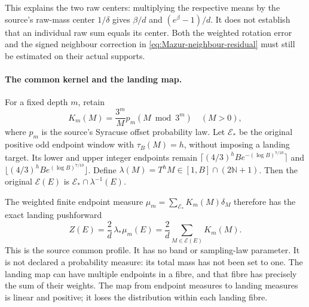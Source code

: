 This explains the two raw centers: multiplying the respective means
by the source's raw-mass center $1/\delta$ gives
$\beta/d$ and $(e^\beta-1)/d$. It does not establish that an
individual raw sum equals its center. Both the weighted rotation error
and the signed neighbour correction in
\eqref{eq:Mazur-neighbour-residual} must still be estimated on their
actual supports.

\paragraph{The common kernel and the landing map.}
For a fixed depth $m$, retain
\[
 K_m(M)=\frac{3^m}{M}p_m(M\bmod3^m)\quad(M>0),
\]
where $p_m$ is the source's Syracuse offset probability law.
Let $\mathcal E_*$ be the original positive odd endpoint window
with $\tau_B(M)=h$, without imposing a landing target. Its lower
and upper integer endpoints remain
$\lceil(4/3)^hB e^{-(\log B)^{7/10}}\rceil$ and
$\lfloor(4/3)^hB e^{(\log B)^{7/10}}\rfloor$.
Define $\lambda(M)=T^hM\in[1,B]\cap(2\mathbb N+1)$.
Then the original $\mathcal E(E)$ is
$\mathcal E_*\cap\lambda^{-1}(E)$.

The weighted finite endpoint measure $\mu_m=\sum_{\mathcal E_*}
K_m(M)\delta_M$ therefore has the exact landing pushforward
\[
 Z(E)=\frac2d\,\lambda_*\mu_m(E)
     =\frac2d\sum_{M\in\mathcal E(E)}K_m(M).
\]
This is the source common profile. It has no band or sampling-law
parameter. It is not declared a probability measure: its total mass
has not been set to one. The landing map can have multiple endpoints
in a fibre, and that fibre has precisely the sum of their weights.
The map from endpoint measures to landing measures is linear and
positive; it loses the distribution within each landing fibre.

